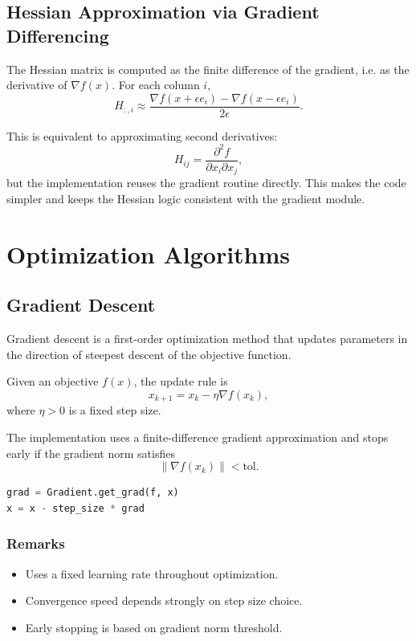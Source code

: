 \documentclass[12pt,a4paper]{report}
\begin{document}
\section{Hessian Approximation via Gradient Differencing}

The Hessian matrix is computed as the finite difference of the gradient, i.e. as the derivative of $\nabla f(x)$. For each column $i$,
\begin{equation}
H_{:,i} \approx \frac{\nabla f(x + \epsilon e_i) - \nabla f(x - \epsilon e_i)}{2\epsilon}.
\end{equation}

This is equivalent to approximating second derivatives:
\begin{equation}
H_{ij} = \frac{\partial^2 f}{\partial x_i \partial x_j},
\end{equation}
but the implementation reuses the gradient routine directly. This makes the code simpler and keeps the Hessian logic consistent with the gradient module.

\chapter{Optimization Algorithms}

\section{Gradient Descent}

Gradient descent is a first-order optimization method that updates parameters in the direction of steepest descent of the objective function.

Given an objective $f(x)$, the update rule is
\begin{equation}
x_{k+1} = x_k - \eta \nabla f(x_k),
\end{equation}
where $\eta > 0$ is a fixed step size.

The implementation uses a finite-difference gradient approximation and stops early if the gradient norm satisfies
\begin{equation}
\|\nabla f(x_k)\| < \text{tol}.
\end{equation}

\begin{lstlisting}[language=Python]
grad = Gradient.get_grad(f, x)
x = x - step_size * grad
\end{lstlisting}

\subsection*{Remarks}
\begin{itemize}
    \item Uses a fixed learning rate throughout optimization.
    \item Convergence speed depends strongly on step size choice.
    \item Early stopping is based on gradient norm threshold.
\end{itemize}
\end{document}
